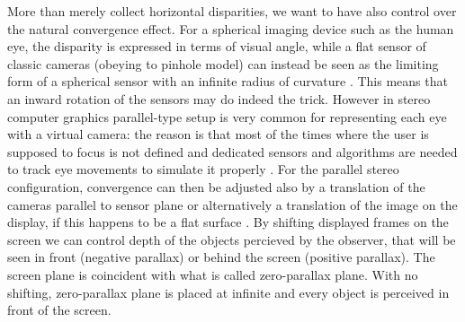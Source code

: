 More than merely collect horizontal disparities, we want to have also control over the natural convergence effect. For a spherical imaging device such as the human eye, the disparity is expressed in terms of visual angle, while a flat sensor of classic cameras (obeying to pinhole model) can instead be seen as the limiting form of a spherical sensor with an infinite radius of curvature \cite{camera_convergence}. This means that an inward rotation of the sensors may do indeed the trick. However in stereo computer graphics parallel-type setup is very common for representing each eye with a virtual camera: the reason is that most of the times where the user is supposed to focus is not defined and dedicated sensors and algorithms are needed to track eye movements to simulate it properly \cite{dynamic_virtual_eye_convergence}. For the parallel stereo configuration, convergence can then be adjusted also by a translation of the cameras parallel to sensor plane or alternatively a translation of the image on the display, if this happens to be a flat surface \cite{camera_convergence}. By shifting displayed frames on the screen we can control depth of the objects percieved by the observer, that will be seen in front (negative parallax) or behind the screen (positive parallax). The screen plane is coincident with what is called zero-parallax plane. With no shifting, zero-parallax plane is placed at infinite and every object is perceived in front of the screen.

